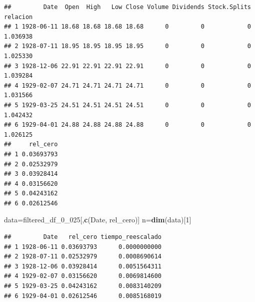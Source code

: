 \documentclass[
  oneside]{article}
\newenvironment{Shaded}{\begin{snugshade}}{\end{snugshade}}
\newcommand{\CommentTok}[1]{\textcolor[rgb]{0.56,0.35,0.01}{\textit{#1}}}
\newcommand{\DecValTok}[1]{\textcolor[rgb]{0.00,0.00,0.81}{#1}}
\newcommand{\FunctionTok}[1]{\textcolor[rgb]{0.13,0.29,0.53}{\textbf{#1}}}
\newcommand{\NormalTok}[1]{#1}
\newcommand{\OtherTok}[1]{\textcolor[rgb]{0.56,0.35,0.01}{#1}}
\newcommand{\SpecialCharTok}[1]{\textcolor[rgb]{0.81,0.36,0.00}{\textbf{#1}}}
\newcommand{\StringTok}[1]{\textcolor[rgb]{0.31,0.60,0.02}{#1}}
\begin{document}
\begin{verbatim}
##         Date  Open  High   Low Close Volume Dividends Stock.Splits relacion
## 1 1928-06-11 18.68 18.68 18.68 18.68      0         0            0 1.036938
## 2 1928-07-11 18.95 18.95 18.95 18.95      0         0            0 1.025330
## 3 1928-12-06 22.91 22.91 22.91 22.91      0         0            0 1.039284
## 4 1929-02-07 24.71 24.71 24.71 24.71      0         0            0 1.031566
## 5 1929-03-25 24.51 24.51 24.51 24.51      0         0            0 1.042432
## 6 1929-04-01 24.88 24.88 24.88 24.88      0         0            0 1.026125
##     rel_cero
## 1 0.03693793
## 2 0.02532979
## 3 0.03928414
## 4 0.03156620
## 5 0.04243162
## 6 0.02612546
\end{verbatim}

\begin{Shaded}
\begin{Highlighting}[]
\NormalTok{data}\OtherTok{=}\NormalTok{filtered\_df\_0\_025[,}\FunctionTok{c}\NormalTok{(}\StringTok{\textquotesingle{}Date\textquotesingle{}}\NormalTok{, }\StringTok{\textquotesingle{}rel\_cero\textquotesingle{}}\NormalTok{)]}
\NormalTok{n}\OtherTok{=}\FunctionTok{dim}\NormalTok{(data)[}\DecValTok{1}\NormalTok{]}
\end{Highlighting}
\end{Shaded}

\begin{Shaded}
\end{Shaded}

\begin{verbatim}
##         Date   rel_cero tiempo_reescalado
## 1 1928-06-11 0.03693793      0.0000000000
## 2 1928-07-11 0.02532979      0.0008690614
## 3 1928-12-06 0.03928414      0.0051564311
## 4 1929-02-07 0.03156620      0.0069814600
## 5 1929-03-25 0.04243162      0.0083140209
## 6 1929-04-01 0.02612546      0.0085168019
\end{verbatim}
\end{document}
